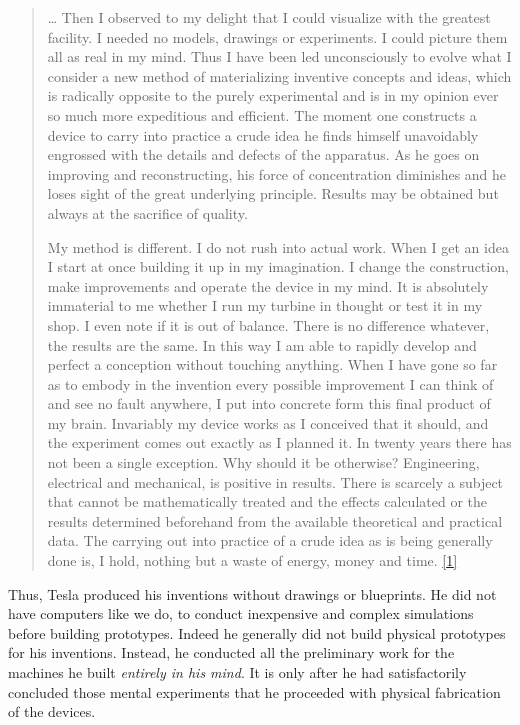 \documentclass[
  a4paper,
]{article}
\begin{document}
\begin{quote}
\ldots{} Then I observed to my delight that I could visualize with the
greatest facility. I needed no models, drawings or experiments. I could
picture them all as real in my mind. Thus I have been led unconsciously
to evolve what I consider a new method of materializing inventive
concepts and ideas, which is radically opposite to the purely
experimental and is in my opinion ever so much more expeditious and
efficient. The moment one constructs a device to carry into practice a
crude idea he finds himself unavoidably engrossed with the details and
defects of the apparatus. As he goes on improving and reconstructing,
his force of concentration diminishes and he loses sight of the great
underlying principle. Results may be obtained but always at the
sacrifice of quality.

My method is different. I do not rush into actual work. When I get an
idea I start at once building it up in my imagination. I change the
construction, make improvements and operate the device in my mind. It is
absolutely immaterial to me whether I run my turbine in thought or test
it in my shop. I even note if it is out of balance. There is no
difference whatever, the results are the same. In this way I am able to
rapidly develop and perfect a conception without touching anything. When
I have gone so far as to embody in the invention every possible
improvement I can think of and see no fault anywhere, I put into
concrete form this final product of my brain. Invariably my device works
as I conceived that it should, and the experiment comes out exactly as I
planned it. In twenty years there has not been a single exception. Why
should it be otherwise? Engineering, electrical and mechanical, is
positive in results. There is scarcely a subject that cannot be
mathematically treated and the effects calculated or the results
determined beforehand from the available theoretical and practical data.
The carrying out into practice of a crude idea as is being generally
done is, I hold, nothing but a waste of energy, money and time.
\protect\hyperlink{ref-john83}{{[}1{]}}
\end{quote}

Thus, Tesla produced his inventions without drawings or blueprints. He
did not have computers like we do, to conduct inexpensive and complex
simulations before building prototypes. Indeed he generally did not
build physical prototypes for his inventions. Instead, he conducted all
the preliminary work for the machines he built \emph{entirely in his
mind}. It is only after he had satisfactorily concluded those mental
experiments that he proceeded with physical fabrication of the devices.
\end{document}
